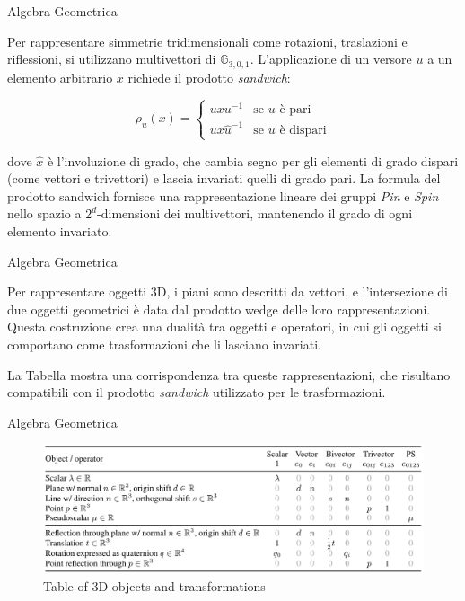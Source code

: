 \begin{frame}{Algebra Geometrica}

    Per rappresentare simmetrie tridimensionali come rotazioni, traslazioni e 
    riflessioni, si utilizzano multivettori di \( \mathbb{G}_{3,0,1} \). 
    L’applicazione di un versore \( u \) a un elemento arbitrario \( x \) 
    richiede il prodotto \textit{sandwich}:

    \begin{equation}\label{eq:4}
        \rho_u(x) = 
        \begin{cases}
            uxu^{-1} & \text{se } u \text{ è pari} \\
            ux\hat{u}^{-1} & \text{se } u \text{ è dispari}
        \end{cases}
    \end{equation}

    dove \( \hat{x} \) è l’involuzione di grado, che cambia segno per gli elementi di 
    grado dispari (come vettori e trivettori) e lascia invariati quelli di grado pari. 
    La formula del prodotto sandwich fornisce una rappresentazione lineare dei gruppi 
    \textit{Pin} e \textit{Spin} nello spazio a \( 2^d \)-dimensioni dei multivettori, 
    mantenendo il grado di ogni elemento invariato.

\end{frame}

\begin{frame}{Algebra Geometrica}

    Per rappresentare oggetti 3D, i piani sono descritti da vettori, e l'intersezione 
    di due oggetti geometrici è data dal prodotto wedge delle loro rappresentazioni. 
    Questa costruzione crea una dualità tra oggetti e operatori, in cui gli oggetti 
    si comportano come trasformazioni che li lasciano invariati.

    La Tabella mostra una corrispondenza tra queste rappresentazioni, che risultano 
    compatibili con il prodotto \textit{sandwich} utilizzato per le trasformazioni.

\end{frame}

\begin{frame}{Algebra Geometrica}
    \begin{figure}
        \centering
        \includegraphics[width=1\textwidth]{../Images/relazioneOggettiOperatori.png}
        \caption{Table of 3D objects and transformations}
    \end{figure}

\end{frame}

